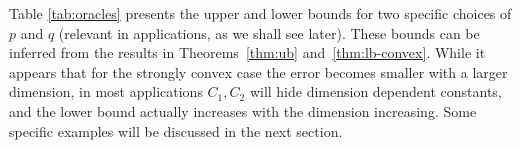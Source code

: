 Table \ref{tab:oracles} presents the upper and lower bounds for two specific choices of $p$ and $q$ (relevant in applications, as we shall see later). These bounds can be inferred from the results in Theorems~\ref{thm:ub} and~\ref{thm:lb-convex}.
While it appears that for the strongly convex case the error becomes smaller with a larger dimension,
in most applications $C_1, C_2$ will hide dimension dependent constants,
and the lower bound actually increases with the dimension increasing.
Some specific examples will be discussed in the next section.


